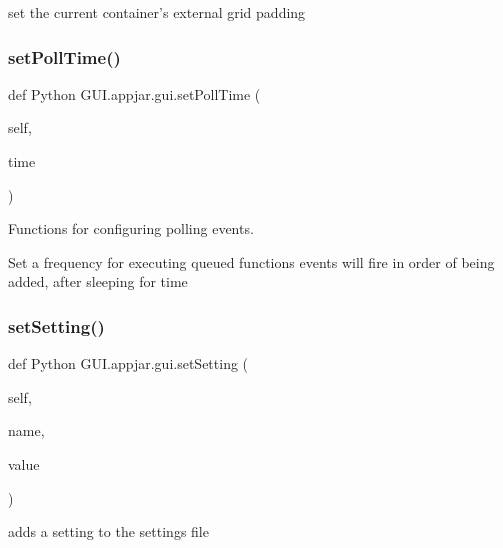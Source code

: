 \begin{DoxyVerb}
\begin{DoxyVerb}set the current container's external grid padding \end{DoxyVerb}
 \mbox{\label{class_python_01_g_u_i_1_1appjar_1_1gui_a40a95de7523923bfc5155bf7a5b19ce2}} 
\subsubsection{\texorpdfstring{set\+Poll\+Time()}{setPollTime()}}
{\footnotesize\ttfamily def Python G\+U\+I.\+appjar.\+gui.\+set\+Poll\+Time (\begin{DoxyParamCaption}\item[{}]{self,  }\item[{}]{time }\end{DoxyParamCaption})}



Functions for configuring polling events. 

\begin{DoxyVerb}Set a frequency for executing queued functions
    events will fire in order of being added, after sleeping for time \end{DoxyVerb}
 \mbox{\label{class_python_01_g_u_i_1_1appjar_1_1gui_a7543a75bb0bb8aee2dfe59bd800c39cc}} 
\subsubsection{\texorpdfstring{set\+Setting()}{setSetting()}}
{\footnotesize\ttfamily def Python G\+U\+I.\+appjar.\+gui.\+set\+Setting (\begin{DoxyParamCaption}\item[{}]{self,  }\item[{}]{name,  }\item[{}]{value }\end{DoxyParamCaption})}

\begin{DoxyVerb}adds a setting to the settings file \end{DoxyVerb}
 \mbox{\label{class_python_01_g_u_i_1_1appjar_1_1gui_afa752d5dda3f11949d4728c734e578ad}} 

\end{DoxyVerb}
